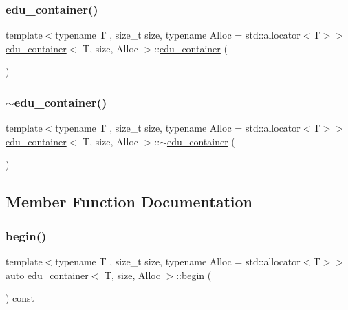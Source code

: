 \subsubsection{\texorpdfstring{edu\+\_\+container()}{edu\_container()}}
{\footnotesize\ttfamily template$<$typename T , size\+\_\+t size, typename Alloc  = std\+::allocator$<$\+T$>$$>$ \\
\hyperlink{classedu__container}{edu\+\_\+container}$<$ T, size, Alloc $>$\+::\hyperlink{classedu__container}{edu\+\_\+container} (\begin{DoxyParamCaption}{ }\end{DoxyParamCaption})\hspace{0.3cm}{\ttfamily [inline]}}

\mbox{\label{classedu__container_a350dad874b99e47a93b074a49841ccf1}} 
\subsubsection{\texorpdfstring{$\sim$edu\+\_\+container()}{~edu\_container()}}
{\footnotesize\ttfamily template$<$typename T , size\+\_\+t size, typename Alloc  = std\+::allocator$<$\+T$>$$>$ \\
\hyperlink{classedu__container}{edu\+\_\+container}$<$ T, size, Alloc $>$\+::$\sim$\hyperlink{classedu__container}{edu\+\_\+container} (\begin{DoxyParamCaption}{ }\end{DoxyParamCaption})\hspace{0.3cm}{\ttfamily [inline]}}



\subsection{Member Function Documentation}
\mbox{\label{classedu__container_a7b97b3fa13a5bb3357062687bd408f7b}} 
\subsubsection{\texorpdfstring{begin()}{begin()}}
{\footnotesize\ttfamily template$<$typename T , size\+\_\+t size, typename Alloc  = std\+::allocator$<$\+T$>$$>$ \\
auto \hyperlink{classedu__container}{edu\+\_\+container}$<$ T, size, Alloc $>$\+::begin (\begin{DoxyParamCaption}{ }\end{DoxyParamCaption}) const\hspace{0.3cm}{\ttfamily [inline]}}


